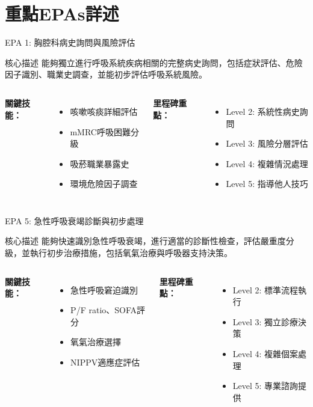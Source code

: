 \documentclass[aspectratio=169]{beamer}
\begin{document}
\section{重點EPAs詳述}

\begin{frame}{EPA 1: 胸腔科病史詢問與風險評估}
\begin{alertblock}{核心描述}
能夠獨立進行呼吸系統疾病相關的完整病史詢問，包括症狀評估、危險因子識別、職業史調查，並能初步評估呼吸系統風險。
\end{alertblock}

\begin{columns}[c]
\textbf{關鍵技能：}
\begin{itemize}
\item 咳嗽咳痰詳細評估
\item mMRC呼吸困難分級
\item 吸菸職業暴露史
\item 環境危險因子調查
\end{itemize}

\textbf{里程碑重點：}
\begin{itemize}
\item Level 2: 系統性病史詢問
\item Level 3: 風險分層評估
\item Level 4: 複雜情況處理
\item Level 5: 指導他人技巧
\end{itemize}
\end{columns}
\end{frame}

\begin{frame}{EPA 5: 急性呼吸衰竭診斷與初步處理}
\begin{alertblock}{核心描述}
能夠快速識別急性呼吸衰竭，進行適當的診斷性檢查，評估嚴重度分級，並執行初步治療措施，包括氧氣治療與呼吸器支持決策。
\end{alertblock}

\begin{columns}[c]
\textbf{關鍵技能：}
\begin{itemize}
\item 急性呼吸窘迫識別
\item P/F ratio、SOFA評分
\item 氧氣治療選擇
\item NIPPV適應症評估
\end{itemize}

\textbf{里程碑重點：}
\begin{itemize}
\item Level 2: 標準流程執行
\item Level 3: 獨立診療決策
\item Level 4: 複雜個案處理
\item Level 5: 專業諮詢提供
\end{itemize}
\end{columns}
\end{frame}
\end{document}

